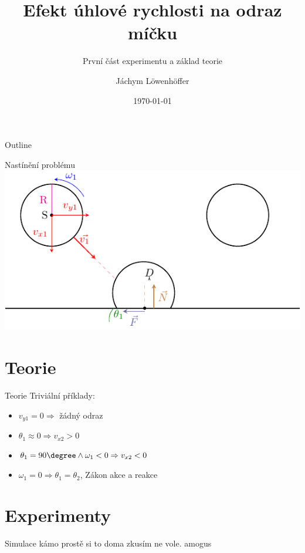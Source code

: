 \documentclass{beamer}
\title{Efekt úhlové rychlosti na odraz míčku}
\subtitle{První část experimentu a základ teorie}
\author{Jáchym Löwenhöffer}
\institute{GEVO JM}
\date{\today}
\begin{document}
 
 \begin{frame}
  \titlepage
 \end{frame}

 \begin{frame}{Outline}
  \tableofcontents
 \end{frame}

 \begin{frame}{Nastínění problému}
  \includegraphics{diagram.pdf}
 \end{frame}

 \section{Teorie} 

\begin{frame}
 \sectionpage
\end{frame}

 \begin{frame}{Teorie}
  Triviální příklady:
  \begin{itemize}
   \item $v_{y1}=0 \Rightarrow $ žádný odraz
   \item $\theta_1\approx0 \Rightarrow v_{x2} > 0$
   \item $\theta_1=90\degree \land \omega_1<0 \Rightarrow v_{x2} < 0 $
   \item $\omega_1=0 \Rightarrow \theta_1=\theta_2 $, Zákon akce a reakce
  \end{itemize}
 \end{frame}

\section{Experimenty}
\begin{frame}
 \sectionpage
\end{frame}

 \begin{frame}{Simulace}
 kámo prostě si to doma zkusím ne vole. amogus
\end{frame}
\end{document}
